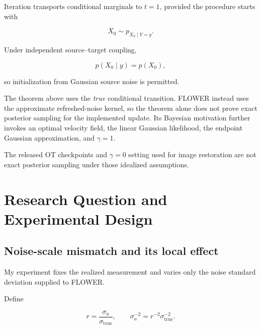 \documentclass[11pt,a4paper]{article}
\newcommand{\sx}{\sigma_{\mathrm{true}}}
\newcommand{\sa}{\sigma_a}
\begin{document}
Iteration transports conditional marginals to $t=1$, provided
the procedure starts with

\begin{equation}
    X_0\sim p_{X_0\mid Y=y}.
\end{equation}

Under independent source--target coupling,

\begin{equation}
    p(X_0\mid y)=p(X_0),
\end{equation}

so initialization from Gaussian source noise is permitted.

The theorem above uses the \emph{true} conditional transition.
FLOWER instead uses the approximate refreshed-noise kernel, so the
theorem alone does not prove exact posterior sampling for the
implemented update. Its Bayesian motivation further invokes an
optimal velocity field, the linear Gaussian likelihood, the endpoint
Gaussian approximation, and $\gamma=1$.

The released OT checkpoints and $\gamma=0$ setting used for image
restoration are not exact posterior sampling under those idealized
assumptions.



\section{Research Question and Experimental Design}


\subsection{Noise-scale mismatch and its local effect}

My experiment fixes the realized measurement and varies only
the noise standard deviation supplied to FLOWER.

Define

\begin{equation}
    r
    =
    \frac{\sa}{\sx},
    \qquad
    \sa^{-2}
    =
    r^{-2}\sx^{-2}.
    \label{eq:ratio}
\end{equation}
\end{document}
